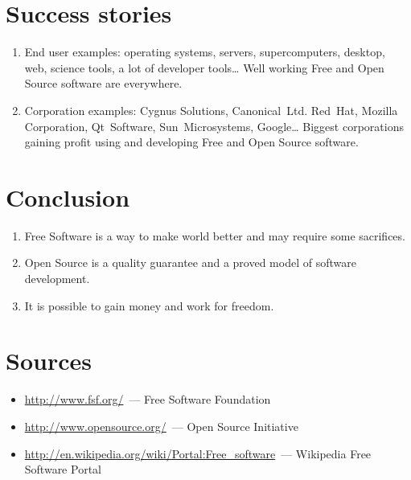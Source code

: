 \documentclass[10pt,a4paper]{article}
\newcommand{\bee}{\begin{enumerate}}
\newcommand{\ene}{\end{enumerate}}
\newcommand{\bit}{\begin{itemize}}
\newcommand{\eit}{\end{itemize}}
\begin{document}
\section{Success stories}
\bee
  \item End user examples: operating systems, servers, supercomputers, desktop, web, 
  science tools, a lot of developer tools\dots
  Well working Free and Open Source software are everywhere.
  \item Corporation examples: Cygnus Solutions, Canonical~Ltd. Red~Hat, Mozilla Corporation, 
  Qt~Software, Sun~Microsystems, Google\dots
  Biggest corporations gaining profit using and developing Free and Open Source software.
\ene

\section{Conclusion}
\bee
  \item Free Software is a way to make world better and may require some sacrifices.
  \item Open Source is a quality guarantee and a proved model of software development.
  \item It is possible to gain money and work for freedom.
\ene

\section*{Sources}
  \bit
    \item \url{http://www.fsf.org/}~--- Free Software Foundation
    \item \url{http://www.opensource.org/}~--- Open Source Initiative
    \item \url{http://en.wikipedia.org/wiki/Portal:Free_software}~--- Wikipedia Free Software Portal
  \eit
\end{document}
